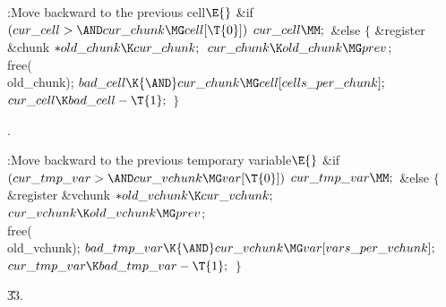 \B{}:Move  backward to the previous cell\X${}\E{}$\6
\&{if} ${}(\\{cur\_cell}>{\AND}\\{cur\_chunk}\MG\\{cell}[\T{0}]){}$\1\5
${}\\{cur\_cell}\MM;{}$\2\6
\&{else}\5
${}\{{}$\1\6
\&{register} \&{chunk} ${}{*}\\{old\_chunk}\K\\{cur\_chunk};{}$\7
${}\\{cur\_chunk}\K\\{old\_chunk}\MG\\{prev}{}$;\5
\\{free}(\\{old\_chunk});\6
${}\\{bad\_cell}\K{\AND}\\{cur\_chunk}\MG\\{cell}[\\{cells\_per\_chunk}];{}$\6
${}\\{cur\_cell}\K\\{bad\_cell}-\T{1};{}$\6
\4${}\}{}$\2\par
{}.\fi

\B{}:Move  backward to the previous temporary
variable\X${}\E{}$\6
\&{if} ${}(\\{cur\_tmp\_var}>{\AND}\\{cur\_vchunk}\MG\\{var}[\T{0}]){}$\1\5
${}\\{cur\_tmp\_var}\MM;{}$\2\6
\&{else}\5
${}\{{}$\1\6
\&{register} \&{vchunk} ${}{*}\\{old\_vchunk}\K\\{cur\_vchunk};{}$\7
${}\\{cur\_vchunk}\K\\{old\_vchunk}\MG\\{prev}{}$;\5
\\{free}(\\{old\_vchunk});\6
${}\\{bad\_tmp\_var}\K{\AND}\\{cur\_vchunk}\MG\\{var}[\\{vars\_per%
\_vchunk}];{}$\6
${}\\{cur\_tmp\_var}\K\\{bad\_tmp\_var}-\T{1};{}$\6
\4${}\}{}$\2\par
\U33.\fi

